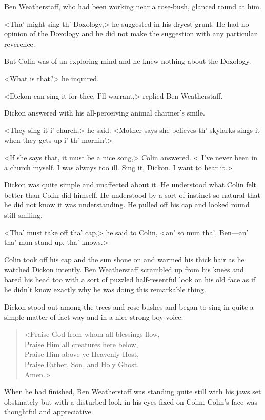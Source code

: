 Ben Weatherstaff, who had been working near a rose-bush, glanced round at him.

<Tha' might sing th' Doxology,> he suggested in his dryest grunt. He had no opinion of the Doxology and he did not make the suggestion with any particular reverence.

But Colin was of an exploring mind and he knew nothing about the Doxology.

<What is that?> he inquired.

<Dickon can sing it for thee, I'll warrant,> replied Ben Weatherstaff.

Dickon answered with his all-perceiving animal charmer's smile.

<They sing it i' church,> he said. <Mother says she believes th' skylarks sings it when they gets up i' th' mornin'.>

<If she says that, it must be a nice song,> Colin answered. < I've never been in a church myself. I was always too ill. Sing it, Dickon. I want to hear it.>

Dickon was quite simple and unaffected about it. He understood what Colin felt better than Colin did himself. He understood by a sort of instinct so natural that he did not know it was understanding. He pulled off his cap and looked round still smiling.

<Tha' must take off tha' cap,> he said to Colin, <an' so mun tha', Ben—an' tha' mun stand up, tha' knows.>

Colin took off his cap and the sun shone on and warmed his thick hair as he watched Dickon intently. Ben Weatherstaff scrambled up from his knees and bared his head too with a sort of puzzled half-resentful look on his old face as if he didn't know exactly why he was doing this remarkable thing.

Dickon stood out among the trees and rose-bushes and began to sing in quite a simple matter-of-fact way and in a nice strong boy voice:

\begin{verse}
<Praise God from whom all blessings flow,\\
Praise Him all creatures here below,\\
Praise Him above ye Heavenly Host,\\
Praise Father, Son, and Holy Ghost.\\
Amen.>
\end{verse}

When he had finished, Ben Weatherstaff was standing quite still with his jaws set obstinately but with a disturbed look in his eyes fixed on Colin. Colin's face was thoughtful and appreciative.

